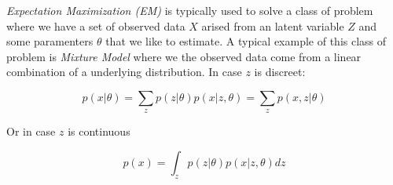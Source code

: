 \emph{Expectation Maximization (EM)} is typically used to solve a class of problem where we have a set of observed data $X$ arised from an latent variable $Z$ and some paramenters $\theta$ that we like to estimate. A typical example of this class of problem is \emph{Mixture Model} where we the observed data come from a linear combination of a underlying distribution. In case $z$ is discreet:

\begin{equation}
	p(x|\theta) = \sum_{z}{p(z | \theta) p(x|z,\theta)} =   \sum_{z}{p(x,z | \theta)}
\end{equation}

Or in case $z$ is continuous 

\begin{equation}
	p(x) = \int_{z}{p(z|\theta)p(x|z,\theta)dz}
\end{equation}

